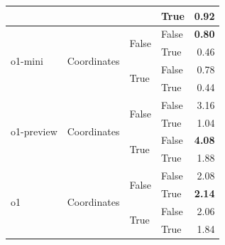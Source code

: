 \documentclass{article}
\begin{document}
\begin{table}
\begin{center}
{\begin{tabular}{@{}llllr@{}}
                                                                        &                                   &                           & True                      & 0.92 \\
    \midrule
    \multirow[c]{4}{*}{o1-mini}                                         & \multirow[c]{4}{*}{Coordinates}   & \multirow[c]{2}{*}{False} & False                     & \textbf{0.80} \\
                                                                        &                                   &                           & True                      & 0.46 \\
                                                                        &                                   & \multirow[c]{2}{*}{True}  & False                     & 0.78 \\
                                                                        &                                   &                           & True                      & 0.44 \\
    \midrule
    \multirow[c]{4}{*}{o1-preview}                                      & \multirow[c]{4}{*}{Coordinates}   & \multirow[c]{2}{*}{False} & False                     & 3.16 \\
                                                                        &                                   &                           & True                      & 1.04 \\
                                                                        &                                   & \multirow[c]{2}{*}{True}  & False                     & \textbf{4.08} \\
                                                                        &                                   &                           & True                      & 1.88 \\
    \midrule
    \multirow[c]{4}{*}{o1}                                              & \multirow[c]{4}{*}{Coordinates}   & \multirow[c]{2}{*}{False} & False                     & 2.08 \\
                                                                        &                                   &                           & True                      & \textbf{2.14} \\
                                                                        &                                   & \multirow[c]{2}{*}{True}  & False                     & 2.06 \\
                                                                        &                                   &                           & True                      & 1.84 \\
   \bottomrule
\end{tabular}
}
    \end{center}
    \label{tab:dm-control-ablation}
\end{table}
\end{document}

